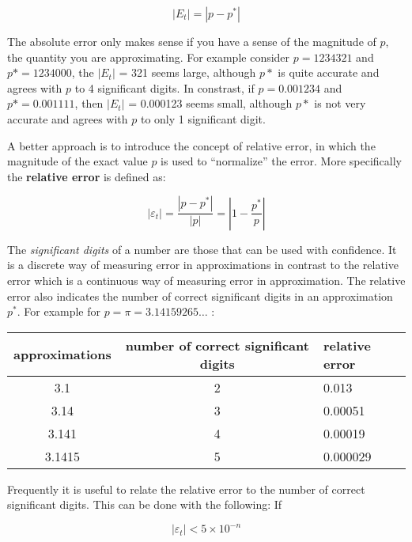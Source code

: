 \documentclass [titlepage,12pt,letter] {article}
\begin{document}
\begin{equation} 
|E_{t}| = | p - p ^{*}|
\end{equation} 

The absolute error only makes sense if you have a sense of the
magnitude of $p$, the quantity you are approximating. For example 
consider $p = 1234321$ and $p* = 1234000$, the $|E_{t}|$ = 321 seems
large, although $p*$ is quite accurate and agrees with $p$ to 4
significant digits. In constrast, if $p = 0.001234$ and $p* =
0.001111$, then $|E_t|$ = 0.000123 seems small, although $p*$ is not
very accurate and agrees with $p$ to only 1 significant digit. 

A better approach is to introduce the concept of relative error, in
which the magnitude of the exact value $p$ is used to ``normalize''
the error. More specifically the {\bf relative error} is defined as: 

\begin{equation} 
|\varepsilon_{t}| = \frac{|p - p^{*}|}{|p|} = |1 - \frac{p^{*}}{p}| 
\end{equation} 


The {\it significant digits} of a number are those that can be used
with confidence. It is a discrete way of measuring error in
approximations in contrast to the relative error which is a continuous
way of measuring error in approximation. The relative error also
indicates the number of correct significant digits in an approximation
$p^*$. For example for $p = \pi = 3.14159265 \dots$ :

\begin{table} 
\begin{tabular}{|c|c|l|}
\hline 
approximations & number of correct significant digits & relative error
\\
\hline
3.1                   & 2       & 0.013 \\
\hline 
3.14                 & 3       & 0.00051 \\ 
\hline 
3.141               & 4       & 0.00019 \\ 
\hline 
3.1415             & 5       & 0.000029 \\ 
\hline 
\end{tabular} 
\end{table} 


Frequently it is useful to relate the relative error to the number of
correct significant digits. This can be done with the
following: If

\begin{equation} 
|\varepsilon_{t} | < 5 \times 10 ^ {-n} 
\end{equation} 
\end{document}
